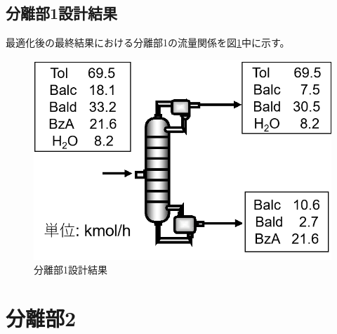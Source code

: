 \documentclass[a4j]{jsreport}
\begin{document}
\section{分離部1設計結果}
最適化後の最終結果における分離部1の流量関係を図\ref{分離部1設計結果の図}中に示す。
\begin{figure}[h]
    \label{分離部1設計結果の図}
    \begin{center}
        \includegraphics[scale=0.7]{Separation1Conclusion.png}
        \caption{分離部1設計結果}
    \end{center}
\end{figure}


\newpage
\chapter{分離部2}
\end{document}
